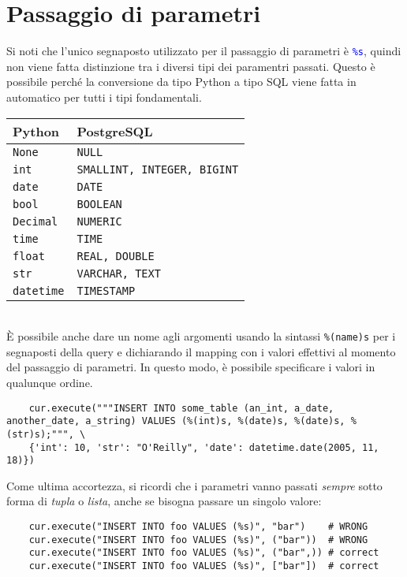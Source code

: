 \documentclass[12pt,a4paper]{book}
\begin{document}
	\section{Passaggio di parametri}
	Si noti che l'unico segnaposto utilizzato per il passaggio di parametri è \textcolor{blue}{\texttt{\%s}}, quindi non viene fatta distinzione tra i diversi tipi dei paramentri passati. Questo è possibile perché la conversione da tipo Python a tipo SQL viene fatta in automatico per tutti i tipi fondamentali.\vspace{10px}\\
	\renewcommand{\arraystretch}{1.5}
	\setlength{\tabcolsep}{20pt}
	\begin{tabular}{l l}
		\hline
		Python & PostgreSQL\\
		\hline
		\texttt{None} & \texttt{NULL}\\
		\texttt{int} & \texttt{SMALLINT, INTEGER, BIGINT}\\
		\texttt{date} & \texttt{DATE}\\
		\texttt{bool} & \texttt{BOOLEAN}\\
		\texttt{Decimal} & \texttt{NUMERIC}\\
		\texttt{time} & \texttt{TIME}\\
		\texttt{float} & \texttt{REAL, DOUBLE}\\
		\texttt{str} & \texttt{VARCHAR, TEXT}\\			
		\texttt{datetime} & \texttt{TIMESTAMP}\\
		\hline
	\end{tabular}\vspace{10px}\\
	È possibile anche dare un nome agli argomenti usando la sintassi \texttt{\%(name)s} per i segnaposti della query e dichiarando il mapping con i valori effettivi al momento del passaggio di parametri. In questo modo, è possibile specificare i valori in qualunque ordine.
	\begin{tcolorbox}[enhanced jigsaw, breakable, title=Esempio, title filled]
	\begin{lstlisting}
	cur.execute("""INSERT INTO some_table (an_int, a_date, another_date, a_string) VALUES (%(int)s, %(date)s, %(date)s, %(str)s);""", \
	{'int': 10, 'str': "O'Reilly", 'date': datetime.date(2005, 11, 18)})
	\end{lstlisting}
	\end{tcolorbox}	
	Come ultima accortezza, si ricordi che i parametri vanno passati \textit{sempre} sotto forma di \textit{tupla} o \textit{lista}, anche se bisogna passare un singolo valore:
	\begin{lstlisting}
	cur.execute("INSERT INTO foo VALUES (%s)", "bar")    # WRONG
	cur.execute("INSERT INTO foo VALUES (%s)", ("bar"))  # WRONG
	cur.execute("INSERT INTO foo VALUES (%s)", ("bar",)) # correct
	cur.execute("INSERT INTO foo VALUES (%s)", ["bar"])  # correct	
	\end{lstlisting}
\end{document}
